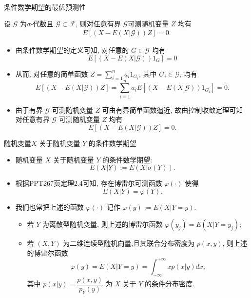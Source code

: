 \documentclass[Prob-All.tex]{subfiles}
\begin{document}
\begin{frame}{条件数学期望的最优预测性}
\begin{thm}
设 $\mathcal{G}$ 为$\sigma$-代数且 $\mathcal{G}\subset\mathcal{F}$, 则对任意有界 $\mathcal{G}$可测随机变量 $Z$ 均有
\begin{eqnarray*}
	E[(X-E(X|\mathcal{G}))Z]=0.
\end{eqnarray*}
\end{thm}
\pause

\zheng
\begin{itemize}[<+-|alert@+>]
\item 由条件数学期望的定义可知, 对任意的 $G\in\mathcal{G}$ 均有
$$E[(X-E(X|\mathcal{G}))1_G]=0$$
\item 从而, 对任意的简单函数 $Z=\sum_{i=1}^na_i1_{G_i}$, 其中 $G_i\in\mathcal{G}$, 均有
$$E[(X-E(X|\mathcal{G}))Z]=\sum_{i=1}^na_iE[(X-E(X|\mathcal{G}))1_{G_i}]=0.$$
\item 由于有界 $\mathcal{G}$ 可测随机变量 $Z$ 可由有界简单函数逼近, 故由控制收敛定理可知对任意有界 $\mathcal{G}$ 可测随机变量 $Z$ 均有
$$E[(X-E(X|\mathcal{G}))Z]=0.$$
\end{itemize}



\end{frame}


\begin{frame}{随机变量$X$ 关于随机变量 $Y$ 的条件数学期望}
\begin{itemize}[<+-|alert@+>]
\item 随机变量 $X$ 关于随机变量 $Y$ 的条件数学期望:
$$E(X|Y):=E(X|\sigma(Y)).$$
\item 根据PPT267页定理2.4可知, 存在博雷尔可测函数 $\varphi(\cdot)$ 使得
$$E(X|Y)=\varphi(Y).$$
\item 我们也常把上述的函数 $\varphi(\cdot)$ 记作 $\varphi(y):=E(X|Y=y)$.
\begin{itemize}[<+-|alert@+>]
\item 若 $Y$ 为离散型随机变量, 则上述的博雷尔函数 $\varphi(y_j)=E(X|Y=y_j)$;
\item 若 $(X,Y)$ 为二维连续型随机向量,且其联合分布密度为 $p(x,y)$, 则上述的博雷尔函数
$$\varphi(y)=E(X|Y=y)=\int_{-\infty}^{+\infty}xp(x|y)dx,$$
其中 $p(x|y)=\dfrac{p(x,y)}{p_Y(y)}$ 为 $X$ 关于 $Y$ 的条件分布密度.
\end{itemize}
\end{itemize}


\end{frame}
\end{document}
